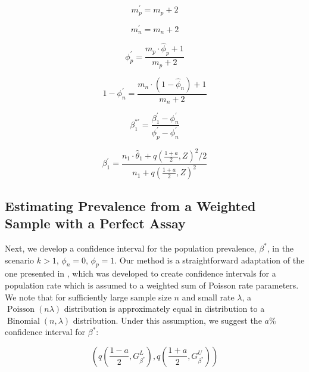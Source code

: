 \documentclass[AMA,STIX1COL]{WileyNJD-v2}
\begin{document}
\begin{equation}
    m_p^\prime = m_p +2
\end{equation}

\begin{equation}
    m_n^\prime = m_n + 2
\end{equation}

\begin{equation}
    \phi_p^\prime = \frac{m_p \cdot \hat{\phi}_p + 1}{m_p + 2}
\end{equation}

\begin{equation}
   1 - \phi_n^\prime = \frac{m_n \cdot (1 - \hat{\phi}_n) + 1}{m_n + 2} 
\end{equation}

\begin{equation}
   \beta_1^{*\prime} = \frac{\beta_1^\prime - \phi_n^\prime}{\phi_p^\prime - \phi_n^\prime} 
\end{equation}

\begin{equation}
    \beta_1^\prime = \frac{n_1 \cdot \hat{\theta}_1 + q\left( \frac{1 + a}{2}, Z \right)^2 / 2}{n_1 + q\left( \frac{1 + a}{2}, Z \right)^2}
\end{equation}

\subsection{Estimating Prevalence from a Weighted Sample with a Perfect Assay}
\label{sec:weight-perfect}
Next, we develop a confidence interval for the population prevalence, \( \beta^* \), in the scenario \( k > 1 \), \( \phi_n = 0 \), \( \phi_p = 1 \).
Our method is a straightforward adaptation of the one presented in \cite{FayF:1997}, which was developed to create confidence intervals for a population rate which is assumed to a weighted sum of Poisson rate parameters.
We note that for sufficiently large sample size \( n \) and small rate \( \lambda \), a \( \operatorname{Poisson}(n\lambda) \) distribution is approximately equal in distribution to a \( \operatorname{Binomial}(n, \lambda) \) distribution.
Under this assumption, we suggest the \( a \)\% confidence interval for \( \beta^* \):

\begin{equation}
    \left( q\left( \frac{1 - a}{2}, G_{\beta^*}^L \right), q \left( \frac{1 + a}{2},  G_{\beta^*}^U \right) \right)
\end{equation}
\end{document}
